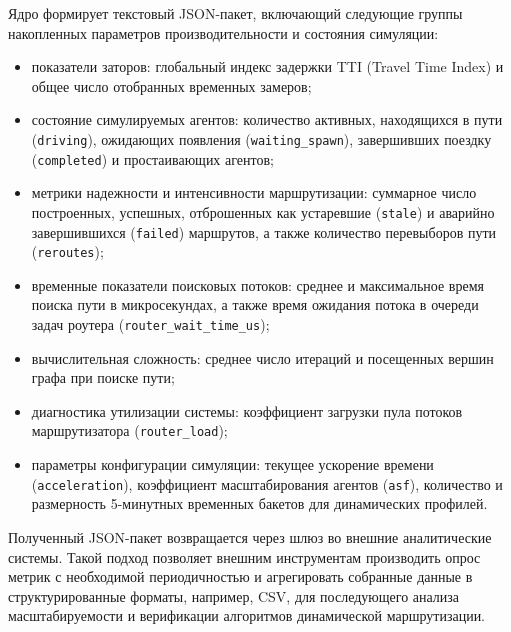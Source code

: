 Ядро формирует текстовый JSON-пакет, включающий следующие группы накопленных параметров производительности и состояния симуляции:
\begin{itemize}
    \item показатели заторов: глобальный индекс задержки TTI (Travel Time Index) и общее число отобранных временных замеров;
    \item состояние симулируемых агентов: количество активных, находящихся в пути (\texttt{driving}), ожидающих появления (\texttt{waiting\_spawn}), завершивших поездку (\texttt{completed}) и простаивающих агентов;
    \item метрики надежности и интенсивности маршрутизации: суммарное число построенных, успешных, отброшенных как устаревшие (\texttt{stale}) и аварийно завершившихся (\texttt{failed}) маршрутов, а также количество перевыборов пути (\texttt{reroutes});
    \item временные показатели поисковых потоков: среднее и максимальное время поиска пути в микросекундах, а также время ожидания потока в очереди задач роутера (\texttt{router\_wait\_time\_us});
    \item вычислительная сложность: среднее число итераций и посещенных вершин графа при поиске пути;
    \item диагностика утилизации системы: коэффициент загрузки пула потоков маршрутизатора (\texttt{router\_load});
    \item параметры конфигурации симуляции: текущее ускорение времени (\texttt{acceleration}), коэффициент масштабирования агентов (\texttt{asf}), количество и размерность 5-минутных временных бакетов для динамических профилей.
\end{itemize}

Полученный JSON-пакет возвращается через шлюз во внешние аналитические системы. Такой подход позволяет внешним инструментам производить опрос метрик с необходимой периодичностью и агрегировать собранные данные в структурированные форматы, например, CSV, для последующего анализа масштабируемости и верификации алгоритмов динамической маршрутизации.
